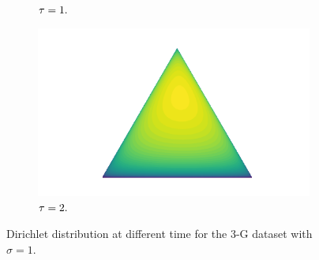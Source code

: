 \begin{figure}[H]
\begin{subfigure}{0.25\textwidth}
        \caption{$\tau = 1.$}
    \end{subfigure}
    \hspace{-0.4cm}
    \begin{subfigure}{0.25\textwidth}
        \centering
        \includegraphics[width=\linewidth]{images/60.png}
		\caption{$\tau = 2.$}
    \end{subfigure}
    \caption{Dirichlet distribution at different time  for the 3-G dataset with $\sigma =1.$}
    \label{fig:dirichlet_triangle_evolution}
\end{figure}